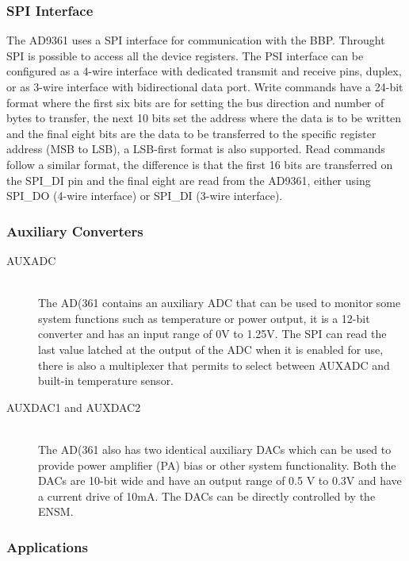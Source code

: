 \subsubsection{SPI Interface}

The AD9361 uses a SPI interface for communication with the BBP. Throught SPI is possible to access all the device registers. The PSI interface can be configured as a 4-wire interface with dedicated transmit and receive pins, duplex, or as 3-wire interface with bidirectional data port.
Write commands have a 24-bit format where the first six bits are for setting the bus direction and number of bytes to transfer, the next 10 bits set the address where the data is to be written and the final eight bits are the data to be transferred to the specific register address (MSB to LSB), a LSB-first format is also supported.
Read commands follow a similar format, the difference is that the first 16 bits are transferred on the SPI\_DI pin and the final eight are read from the AD9361, either using SPI\_DO (4-wire interface) or SPI\_DI (3-wire interface).

\subsubsection{Auxiliary Converters}

\begin{description}

	\item[AUXADC] \hfill \\
	The AD(361 contains an auxiliary ADC that can be used to monitor some system functions such as temperature or power output, it is a 12-bit converter and has an input range of 0V to 1.25V. The SPI can read the last value latched at the output of the ADC when it is enabled for use, there is also a multiplexer that permits to select between AUXADC and built-in temperature sensor.

	\item[AUXDAC1 and AUXDAC2] \hfill \\
	The AD(361 also has two identical auxiliary DACs which can be used to provide power amplifier (PA) bias or other system functionality. Both the DACs are 10-bit wide and have an output range of 0.5 V to 0.3V and have a current drive of 10mA. The DACs can be directly controlled by the ENSM.

\end{description}

\subsubsection{Applications}


